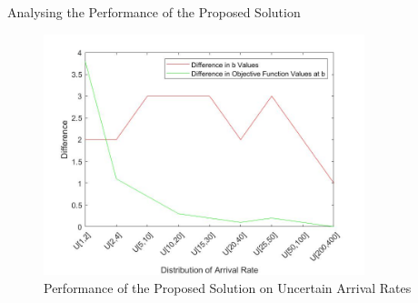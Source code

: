 \documentclass[9pt]{beamer}
\begin{document}
\begin{frame}{Analysing the Performance of the Proposed Solution}
\begin{figure}
\includegraphics[height=7cm]{correctedUni.jpg}
\caption{Performance of the Proposed Solution on Uncertain Arrival Rates}
\end{figure}
\end{frame}
\end{document}
